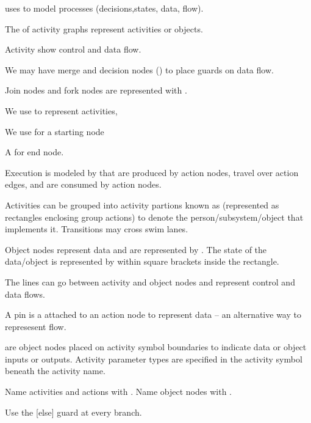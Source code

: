 \begin{compactitem}
\item {}
uses
to model processes (decisions,states, data, flow). 
\begin{compactitem}
\item The  of activity graphs represent activities or objects. 
\item Activity  show control and data flow. 
\item We may have merge and decision nodes () to place guards on data flow. 
\item Join nodes and fork nodes are represented with . 
\item We use  to represent activities, \item We use  for a starting node
\item A for end node. 
\item Execution is modeled by
that are produced by action
nodes, travel over action edges, and are consumed by action
nodes. 
\item Activities can be grouped into activity partions known as  (represented as rectangles enclosing group actions) to
denote the person/subsystem/object that implements it.
Transitions may cross swim lanes.

\item Object nodes
represent data and are
represented by . The
state of the data/object is represented by within square
brackets inside the rectangle.

\item The lines can go between activity and object nodes and represent control and data flows.

\item A
pin
is a  attached to an action node to represent
data – an alternative way to represesent flow.

\item {} are object nodes placed on activity
symbol boundaries to indicate data or object inputs or
outputs.
Activity parameter types are specified in the activity
symbol beneath the activity name.
\end{compactitem}


\item Name activities and actions with .
Name object nodes with .

\item Use the [else] guard at every branch.
\end{compactitem}










